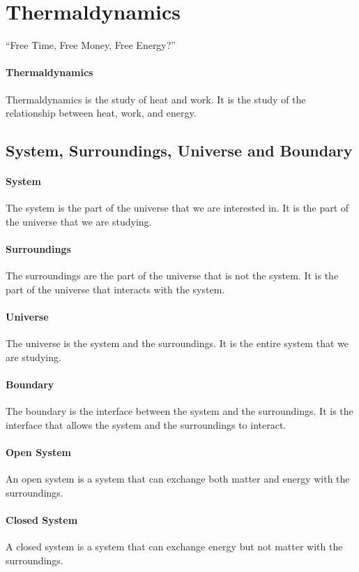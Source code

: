 \documentclass[11pt]{report}
\begin{document}
\section{Thermaldynamics}
\begin{center}
    ``Free Time, Free Money, Free Energy?''
\end{center}
\paragraph{Thermaldynamics} Thermaldynamics is the study of heat and work. It is the study of the relationship between heat, work, and energy.
\subsection{System, Surroundings, Universe and Boundary}
\paragraph{System} The system is the part of the universe that we are interested in. It is the part of the universe that we are studying.
\paragraph{Surroundings} The surroundings are the part of the universe that is not the system. It is the part of the universe that interacts with the system.   
\paragraph{Universe} The universe is the system and the surroundings. It is the entire system that we are studying.
\paragraph{Boundary} The boundary is the interface between the system and the surroundings. It is the interface that allows the system and the surroundings to interact.
\paragraph{Open System} An open system is a system that can exchange both matter and energy with the surroundings.
\paragraph{Closed System} A closed system is a system that can exchange energy but not matter with the surroundings.
\end{document}
